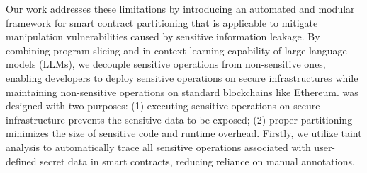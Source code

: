Our work addresses these limitations by introducing an automated and modular framework for smart contract partitioning {that is applicable to mitigate manipulation vulnerabilities caused by sensitive information leakage.}
By combining program slicing and in-context learning capability of large language models (LLMs), we decouple sensitive operations from non-sensitive ones, enabling developers to deploy sensitive operations on secure infrastructures while maintaining non-sensitive operations on standard blockchains like Ethereum. 
\tool was designed with two purposes: (1) executing sensitive operations on secure infrastructure prevents the sensitive data to be exposed; (2) proper partitioning minimizes the size of sensitive code and runtime overhead.
Firstly, we utilize taint analysis to automatically trace all sensitive operations associated with user-defined secret data in smart contracts, reducing reliance on manual annotations.
